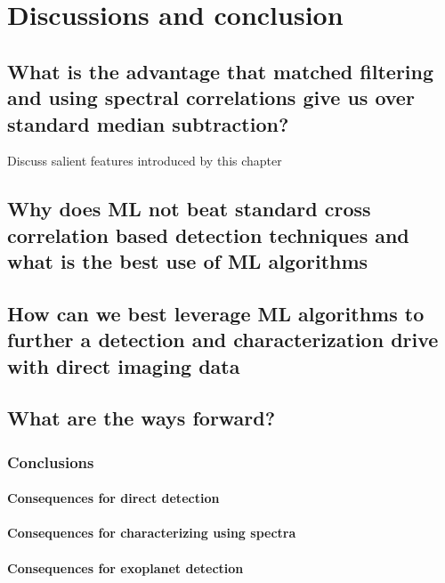 \part{Discussions and conclusion}
\startcontents[chapters]
\printmyminitoc{}
\chapter{What is the advantage that matched filtering and using spectral correlations give us over standard median subtraction?}
Discuss salient features introduced by this chapter
\chapter{Why does ML not beat standard cross correlation based detection techniques and what is the best use of ML algorithms}
\chapter{How can we best leverage ML algorithms to further a detection and characterization drive with direct imaging data}
\chapter{What are the ways forward?}
\section{Conclusions}
\subsection{Consequences for direct detection}
\subsection{Consequences for characterizing using spectra}
\subsection{Consequences for exoplanet detection}